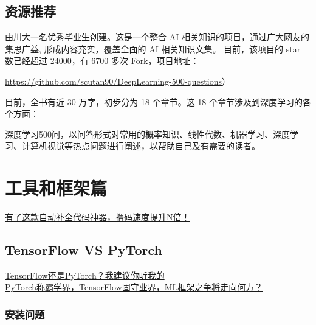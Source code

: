 \documentclass[
]{book}
\begin{document}
\hypertarget{ux8d44ux6e90ux63a8ux8350-1}{%
\section{资源推荐}\label{ux8d44ux6e90ux63a8ux8350-1}}

由川大一名优秀毕业生创建。这是一个整合 AI 相关知识的项目，通过广大网友的集思广益, 形成内容充实，覆盖全面的 AI 相关知识文集。
目前，该项目的 star 数已经超过 24000，有 6700 多次 Fork，项目地址：

\url{https://github.com/scutan90/DeepLearning-500-questions}）

目前，全书有近 30 万字，初步分为 18 个章节。这 18 个章节涉及到深度学习的各个方面：

深度学习500问，以问答形式对常用的概率知识、线性代数、机器学习、深度学习、计算机视觉等热点问题进行阐述，以帮助自己及有需要的读者。

\hypertarget{ux5de5ux5177ux548cux6846ux67b6ux7bc7}{%
\chapter{工具和框架篇}\label{ux5de5ux5177ux548cux6846ux67b6ux7bc7}}

\href{https://mp.weixin.qq.com/s?__biz=MzA4MjYwMTc5Nw==\&mid=2648931621\&idx=1\&sn=ff25bd9d9d6794677841f87cfa3f96c2\&chksm=8794ef0fb0e3661997114fd975dcbc5ef1538d0d65583c5e77db7b9a5d55e6a7a21dbaffd433\&token=2004915986\&lang=en_US\#rd}{有了这款自动补全代码神器，撸码速度提升N倍！}

\hypertarget{tensorflow-vs-pytorch}{%
\section{TensorFlow VS PyTorch}\label{tensorflow-vs-pytorch}}

\href{https://mp.weixin.qq.com/s?__biz=MzA4MjYwMTc5Nw==\&mid=2648931635\&idx=1\&sn=a7fd9500f40768559163f20fe03e9700\&chksm=8794ef19b0e3660fc379aef1387fe0f04ee54d5bfb2e1384efcdd456c38dc55c9affb4d35350\&token=2004915986\&lang=en_US\#rd}{TensorFlow还是PyTorch？我建议你听我的}\\
\href{https://mp.weixin.qq.com/s?__biz=MzA4MjYwMTc5Nw==\&mid=2648931837\&idx=2\&sn=4f7eeac6e3bdcecdf95d14fc7d41ca26\&chksm=8794efd7b0e366c1368dc67cc0f2c3dbacfdcb504ab050398d66328cb062832eef1aec9894c4\&token=2004915986\&lang=en_US\#rd}{PyTorch称霸学界，TensorFlow固守业界，ML框架之争将走向何方？}

\hypertarget{ux5b89ux88c5ux95eeux9898}{%
\subsection{安装问题}\label{ux5b89ux88c5ux95eeux9898}}
\end{document}
